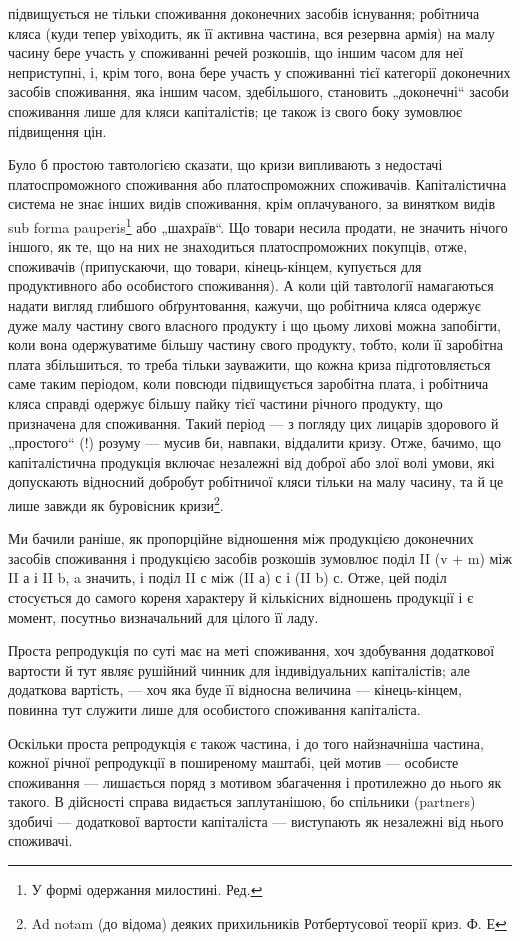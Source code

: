 \parcont{}  %
підвищується не тільки споживання доконечних засобів існування; робітнича
кляса (куди тепер увіходить, як її активна частина, вся резервна
армія) на малу часину бере участь у споживанні речей розкошів, що іншим
часом для неї неприступні, і, крім того, вона бере участь у споживанні
тієї категорії доконечних засобів споживання, яка іншим часом, здебільшого,
становить „доконечні“ засоби споживання лише для кляси капіталістів;
це також із свого боку зумовлює підвищення цін.

Було б простою тавтологією сказати, що кризи випливають з недостачі
платоспроможного споживання або платоспроможних споживачів.
Капіталістична система не знає інших видів споживання, крім оплачуваного,
за винятком видів sub forma pauperis\footnote*{
У формі одержання милостині. Ред.
} або „шахраїв“. Що
товари несила продати, не значить нічого іншого, як те, що на них не
знаходиться платоспроможних покупців, отже, споживачів (припускаючи,
що товари, кінець-кінцем, купується для продуктивного або особистого
споживання). А коли цій тавтології намагаються надати вигляд
глибшого обґрунтовання, кажучи, що робітнича кляса одержує дуже малу
частину свого власного продукту і що цьому лихові можна запобігти,
коли вона одержуватиме більшу частину свого продукту, тобто, коли її
заробітна плата збільшиться, то треба тільки зауважити, що кожна криза
підготовляється саме таким періодом, коли повсюди підвищується заробітна
плата, і робітнича кляса справді одержує більшу пайку тієї частини
річного продукту, що призначена для споживання. Такий період — з погляду
цих лицарів здорового й „простого“ (!) розуму — мусив би, навпаки,
віддалити кризу. Отже, бачимо, що капіталістична продукція включає
незалежні від доброї або злої волі умови, які допускають відносний
добробут робітничої кляси тільки на малу часину, та й це лише завжди
як буровісник кризи\footnote{
Ad notam (до відома) деяких прихильників Ротбертусової теорії криз. Ф. Е
}.

Ми бачили раніше, як пропорційне відношення між продукцією
доконечних засобів споживання і продукцією засобів розкошів зумовлює
поділ II (v + m) між II а і II b, a значить, і поділ II с між (II а) с і (II b) с.
Отже, цей поділ стосується до самого кореня характеру й кількісних відношень
продукції і є момент, посутньо визначальний для цілого її ладу.

Проста репродукція по суті має на меті споживання, хоч здобування
додаткової вартости й тут являє рушійний чинник для індивідуальних
капіталістів; але додаткова вартість, — хоч яка буде її відносна величина —
кінець-кінцем, повинна тут служити лише для особистого споживання
капіталіста.

Оскільки проста репродукція є також частина, і до того найзначніша
частина, кожної річної репродукції в поширеному маштабі, цей мотив —
особисте споживання — лишається поряд з мотивом збагачення і протилежно
до нього як такого. В дійсності справа видається заплутанішою,
бо спільники (partners) здобичі — додаткової вартости капіталіста — виступають
як незалежні від нього споживачі.
